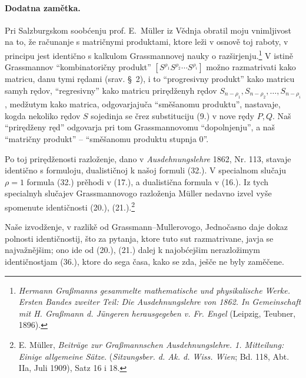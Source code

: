 \documentclass[11pt]{article}
\begin{document}
\paragraph{Dodatna zamětka.} Pri Salzburgskom soobćenju prof. \mbox{E. Müller} iz Vědnja obratil moju vnimljivost na to, že računanje s matričnymi produktami, ktore leži v osnově toj raboty, v principu jest identično s kalkulom Grassmannovej nauky o razširjenju.\footnote{\emph{Hermann Graßmanns gesammelte mathematische und physikalische Werke. Ersten Bandes zweiter Teil: Die Ausdehnungslehre von 1862. In Gemeinschaft mit H. Graßmann d. Jüngeren herausgegeben v. Fr. Engel} (Leipzig, Teubner, 1896).} V istině Grassmannov ``kombinatoričny produkt'' $[S^{\rho_1}S^{\rho_2}\cdots S^{\rho_i}]$ možno razmatrivati kako matricu, danu tymi rędami (srav. \S\ 2), i to ``progresivny produkt'' kako matricu samyh rędov, ``regresivny'' kako matricu prirędženyh rędov $S_{n-\rho_1},S_{n-\rho_2},\ldots,S_{n-\rho_i}$, medžutym kako matrica, odgovarjajuča ``směšanomu produktu'', nastavaje, kogda nekoliko rędov $S$ sojedinja se črez substituciju (9.) v nove rędy $P,Q$. Naš ``prirędženy ręd'' odgovarja pri tom Grassmannovomu ``dopolnjenju'', a naš ``matričny produkt'' -- ``směšanomu produktu stupnja 0''.

Po toj prirędženosti razloženje, dano v \emph{Ausdehnungslehre} 1862, Nr. 113, stavaje identično s formuloju, dualističnoj k našoj formuli (32.). V specialnom slučaju $\rho=1$ formula (32.) prěhodi v (17.), a dualistična formula v (16.). Iz tych specialnyh slučajev Grassmannovogo razloženja \mbox{Müller} nedavno izvel vyše spomenute identičnosti (20.), (21.).\footnote{E. \mbox{Müller}, \emph{Beiträge zur Graßmannschen Ausdehnungslehre. 1. Mitteilung: Einige allgemeine Sätze}. (\emph{Sitzungsber. d. Ak. d. Wiss. Wien}; Bd. 118, Abt. IIa, Juli 1909), Satz 16 i 18.}

Naše izvodženje, v razlikě od Grassmann--Mullerovogo, Jednočasno daje dokaz polnosti identičnostij, što za pytanja, ktore tuto sut razmatrivane, javja se najvažnějšim; ono ide od (20.), (21.) dalej k najobćejšim nerazložimym identičnostjam (36.), ktore do sega časa, kako se zda, ješče ne byly zaměčene.
\end{document}
